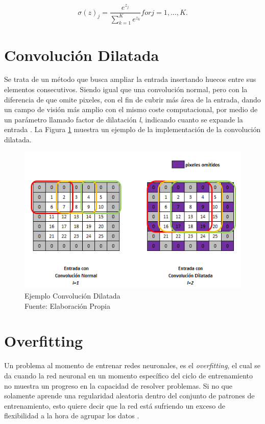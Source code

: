 \begin{equation}
	\label{eq:softmax}
	\sigma \left ( z \right )_j=\frac{e^{z_j}}{\sum ^{K}_{k=1}e^{z_k}}  for j=1,...,K.
\end{equation}

\section{Convolución Dilatada}

Se trata de un método que busca ampliar la entrada insertando huecos entre sus elementos consecutivos. Siendo igual que una convolución normal, pero con la diferencia de que omite pixeles, con el fin de cubrir más área de la entrada, dando un campo de visión más amplio con el mismo coste computacional, por medio de un parámetro llamado factor de dilatación \textit{l}, indicando cuanto se expande la entrada \cite{wu2019fastfcn}. La Figura \ref{fig:cd} muestra un ejemplo de la implementación de la convolución dilatada.

\begin{figure}[ht]
	\centering
	\includegraphics[scale=0.6]{Figs/Convolucion_dilatada.png}
	\caption{Ejemplo Convolución Dilatada \\Fuente: Elaboración Propia}
	\label{fig:cd}
\end{figure}

\section{Overfitting}

Un problema al momento de entrenar redes neuronales, es el \textit{overfitting}, el cual se da cuando la red neuronal en un momento específico del ciclo de entrenamiento no muestra un progreso en la capacidad de resolver problemas. Si no que solamente aprende una regularidad aleatoria dentro del conjunto de patrones de entrenamiento, esto quiere decir que la red está sufriendo un exceso de flexibilidad a la hora de agrupar los datos \cite{jabbar2015methods}.

